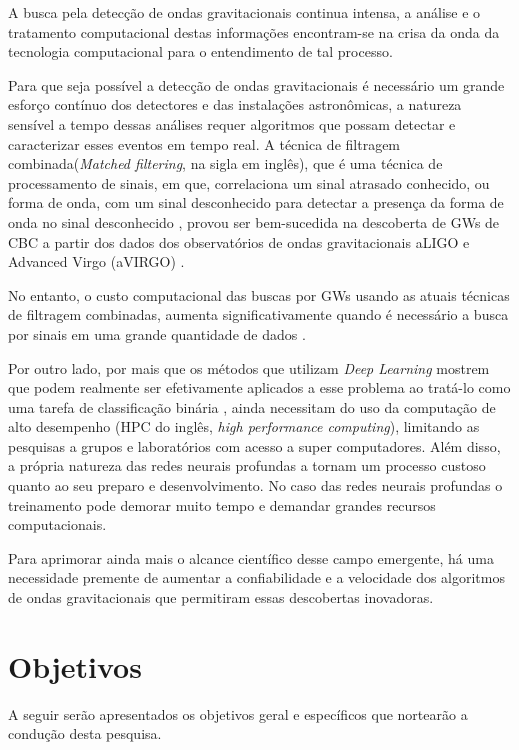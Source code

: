 A busca pela detecção de ondas gravitacionais continua intensa, a análise e o tratamento computacional destas informações encontram-se na crisa da onda da tecnologia computacional para o entendimento de tal processo.

Para que seja possível a detecção de ondas gravitacionais é necessário um grande esforço contínuo dos detectores e das instalações astronômicas, a natureza sensível a tempo dessas análises requer algoritmos que possam detectar e caracterizar esses eventos em tempo real. A técnica de filtragem combinada(\textit{Matched filtering}, na sigla em inglês), que é uma técnica de processamento de sinais, em que, correlaciona um sinal atrasado conhecido, ou forma de onda, com um sinal desconhecido para detectar a presença da forma de onda no sinal desconhecido \cite{turin1960introduction, Schutz_1999}, provou ser bem-sucedida na descoberta de GWs de CBC a partir dos dados dos observatórios de ondas gravitacionais aLIGO e Advanced Virgo (aVIRGO) \cite{gebhard2019convolutional}.

No entanto, o custo computacional das buscas por GWs usando as atuais técnicas de filtragem combinadas, aumenta significativamente quando é necessário a busca por sinais em uma grande quantidade de dados \cite{abbott2018prospects}.

Por outro lado, por mais que os métodos que utilizam \textit{Deep Learning} mostrem que podem realmente ser efetivamente aplicados a esse problema ao tratá-lo como uma tarefa de classificação binária \cite{gebhard2019convolutional}, ainda necessitam do uso da computação de alto desempenho (HPC do inglês, \textit{high performance computing}), limitando as pesquisas a grupos e laboratórios com acesso a super computadores. Além disso, a própria natureza das redes neurais profundas a tornam um processo custoso quanto ao seu preparo e desenvolvimento. No caso das redes neurais profundas o treinamento pode demorar muito tempo e demandar grandes recursos computacionais.

Para aprimorar ainda mais o alcance científico desse campo emergente, há uma necessidade premente de aumentar a confiabilidade e a velocidade dos algoritmos de ondas gravitacionais que permitiram essas descobertas inovadoras.

\section{Objetivos}
\label{sec:objetivos}

A seguir serão apresentados os objetivos geral e específicos que nortearão a condução desta pesquisa.

